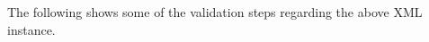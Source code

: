 \documentclass{entcs}
\begin{document}
The following shows some of the validation steps regarding the
above XML instance.
\end{document}

